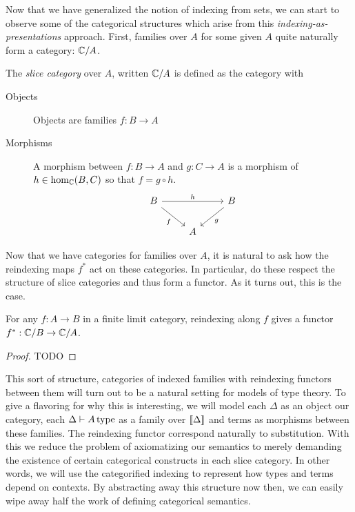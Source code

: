 Now that we have generalized the notion of indexing from sets, we can
start to observe some of the categorical structures which arise from
this \emph{indexing-as-presentations} approach. First, families over
$A$ for some given $A$ quite naturally form a category: $\mathbb{C}/A$.
\begin{defn}\label{defn:fibrations:slicecat}
  The \emph{slice category} over $A$, written $\mathbb{C}/A$ is defined as
  the category with
  \begin{description}
  \item[Objects] Objects are families $f : B \to A$
  \item[Morphisms] A morphism between $f : B \to A$ and $g : C \to A$ is
    a morphism of $h \in \hom_{\mathbb{C}}(B, C)$ so that $f = g \circ h$.
    \[
      \begin{tikzcd}
        B \ar[rr, "h"] \ar[dr, swap, "f"] & & B \ar[dl, "g"]\\
        & A &
      \end{tikzcd}
    \]
  \end{description}
\end{defn}
Now that we have categories for families over $A$, it is natural to
ask how the reindexing maps $f^*$ act on these categories. In
particular, do these respect the structure of slice categories and
thus form a functor. As it turns out, this is the case.
\begin{thm}\label{thm:fibrations:pullbackfunctor}
  For any $f : A \to B$ in a finite limit category, reindexing along
  $f$ gives a functor $f^* : \mathbb{C}/B \to \mathbb{C}/A$.
\end{thm}
\begin{proof}
  TODO
\end{proof}

This sort of structure, categories of indexed families with reindexing
functors between them will turn out to be a natural setting for models
of type theory. To give a flavoring for why this is interesting, we
will model each $\Delta$ as an object our category, each
$\Delta \vdash A\,\mathrm{type}$ as a family over $\llbracket \Delta \rrbracket$ and
terms as morphisms between these families. The reindexing functor
correspond naturally to substitution. With this we reduce the problem
of axiomatizing our semantics to merely demanding the existence of
certain categorical constructs in each slice category. In other words,
we will use the categorified indexing to represent how types and terms
depend on contexts. By abstracting away this structure now then, we
can easily wipe away half the work of defining categorical semantics.

